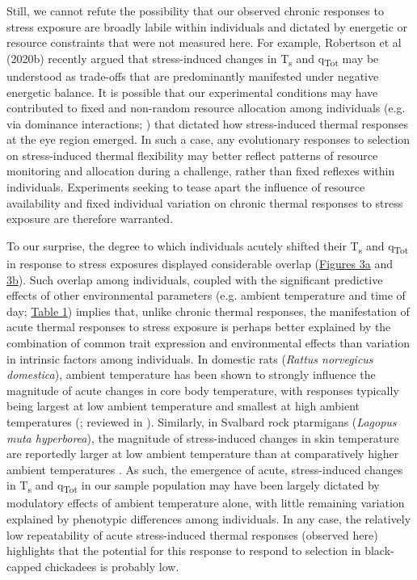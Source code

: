 \documentclass[12pt]{article}
\begin{document}
\noindent Still, we cannot refute the possibility that our observed chronic responses to stress exposure are broadly labile within individuals and dictated by energetic or resource constraints that were not measured here. For example, Robertson et al (2020b) recently argued that stress-induced changes in T\textsubscript{s} and q\textsubscript{Tot} may be understood as trade-offs that are predominantly manifested under negative energetic balance. It is possible that our experimental conditions may have contributed to fixed and non-random resource allocation among individuals (e.g. via dominance interactions; \citealt{ratcliffe_2007}) that dictated how stress-induced thermal responses at the eye region emerged. In such a case, any evolutionary responses to selection on stress-induced thermal flexibility may better reflect patterns of resource monitoring and allocation during a challenge, rather than fixed reflexes within individuals. Experiments seeking to tease apart the influence of resource availability and fixed individual variation on chronic thermal responses to stress exposure are therefore warranted. \vspace{1cm}

\noindent To our surprise, the degree to which individuals acutely shifted their T\textsubscript{s} and q\textsubscript{Tot} in response to stress exposures displayed considerable overlap (\hyperref[Fig4.3]{Figures 3a} and \hyperref[Fig4.3]{3b}). Such overlap among individuals, coupled with the significant predictive effects of other environmental parameters (e.g. ambient temperature and time of day; \hyperref[Tab4.1]{Table 1}) implies that, unlike chronic thermal responses, the manifestation of acute thermal responses to stress exposure is perhaps better explained by the combination of common trait expression and environmental effects than variation in intrinsic factors among individuals. In domestic rats (\textit{Rattus norvegicus domestica}), ambient temperature has been shown to strongly influence the magnitude of acute changes in core body temperature, with responses typically being largest at low ambient temperature and smallest at high ambient temperatures (\citealt{briese_1992}; reviewed in \citealt{oka_2018}). Similarly, in Svalbard rock ptarmigans (\textit{Lagopus muta hyperborea}), the magnitude of stress-induced changes in skin temperature are reportedly larger at low ambient temperature than at comparatively higher ambient temperatures \citep{nord_2019b}. As such, the emergence of acute, stress-induced changes in T\textsubscript{s} and q\textsubscript{Tot} in our sample population may have been largely dictated by modulatory effects of ambient temperature alone, with little remaining variation explained by phenotypic differences among individuals. In any case, the relatively low repeatability of acute stress-induced thermal responses (observed here) highlights that the potential for this response to respond to selection in black-capped chickadees is probably low.\vspace{0.5cm}
\end{document}

